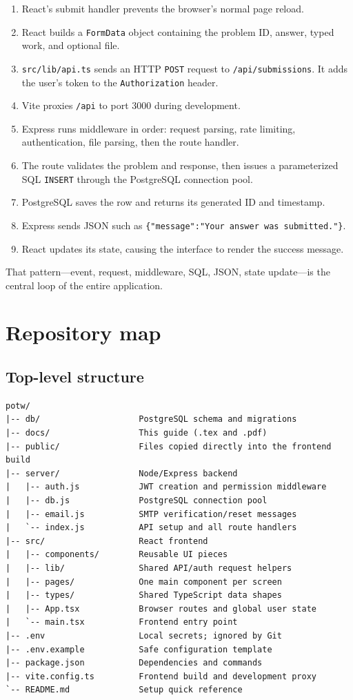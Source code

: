 \documentclass[11pt,oneside]{book}
\newcommand{\file}[1]{\texttt{#1}}
\newcommand{\route}[1]{\texttt{#1}}
\newcommand{\code}[1]{\texttt{#1}}
\begin{document}
\begin{enumerate}
  \item React's submit handler prevents the browser's normal page reload.
  \item React builds a \code{FormData} object containing the problem ID, answer, typed work, and optional file.
  \item \file{src/lib/api.ts} sends an HTTP \code{POST} request to \route{/api/submissions}. It adds the user's token to the \code{Authorization} header.
  \item Vite proxies \route{/api} to port 3000 during development.
  \item Express runs middleware in order: request parsing, rate limiting, authentication, file parsing, then the route handler.
  \item The route validates the problem and response, then issues a parameterized SQL \code{INSERT} through the PostgreSQL connection pool.
  \item PostgreSQL saves the row and returns its generated ID and timestamp.
  \item Express sends JSON such as \code{\{"message":"Your answer was submitted."\}}.
  \item React updates its state, causing the interface to render the success message.
\end{enumerate}

That pattern---event, request, middleware, SQL, JSON, state update---is the central loop of the entire application.

\chapter{Repository map}

\section{Top-level structure}
\begin{lstlisting}[language={},numbers=none]
potw/
|-- db/                    PostgreSQL schema and migrations
|-- docs/                  This guide (.tex and .pdf)
|-- public/                Files copied directly into the frontend build
|-- server/                Node/Express backend
|   |-- auth.js            JWT creation and permission middleware
|   |-- db.js              PostgreSQL connection pool
|   |-- email.js           SMTP verification/reset messages
|   `-- index.js           API setup and all route handlers
|-- src/                   React frontend
|   |-- components/        Reusable UI pieces
|   |-- lib/               Shared API/auth request helpers
|   |-- pages/             One main component per screen
|   |-- types/             Shared TypeScript data shapes
|   |-- App.tsx            Browser routes and global user state
|   `-- main.tsx           Frontend entry point
|-- .env                   Local secrets; ignored by Git
|-- .env.example           Safe configuration template
|-- package.json           Dependencies and commands
|-- vite.config.ts         Frontend build and development proxy
`-- README.md              Setup quick reference
\end{lstlisting}
\end{document}
